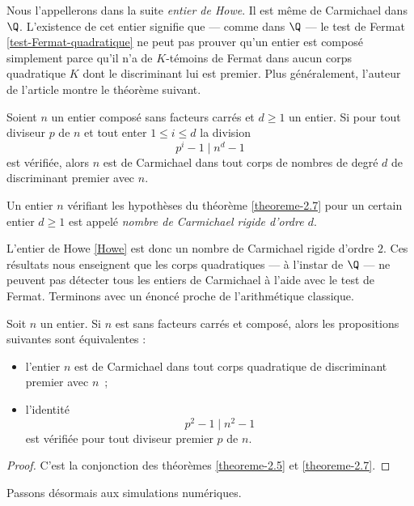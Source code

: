 Nous l'appellerons dans la suite \emph{entier de Howe}. Il est même de Carmichael dans $\Q$. L'existence de cet entier signifie que — comme dans $\Q$ — le test de Fermat \ref{test-Fermat-quadratique} ne peut pas prouver qu'un entier est composé simplement parce qu'il n'a de $K$-témoins de Fermat dans aucun corps quadratique $K$ dont le discriminant lui est premier. Plus généralement, l'auteur de l'article montre le théorème suivant.

\begin{theoreme}\label{theoreme-2.7}
	Soient $n$ un entier composé sans facteurs carrés et $d\geq 1$ un entier. Si pour tout diviseur $p$ de $n$ et tout enter $1\leq i \leq d$ la division $$p^i - 1\mid n^d - 1$$ est vérifiée, alors $n$ est de Carmichael dans tout corps de nombres de degré $d$ de discriminant premier avec $n$.
\end{theoreme}

\begin{definition}
	Un entier $n$ vérifiant les hypothèses du théorème \ref{theoreme-2.7} pour un certain entier $d\geq 1$ est appelé \emph{nombre de Carmichael rigide d'ordre $d$}.
\end{definition}

L'entier de Howe \ref{Howe} est donc un nombre de Carmichael rigide d'ordre $2$. Ces résultats nous enseignent que les corps quadratiques — à l'instar de $\Q$ — ne peuvent pas détecter tous les entiers de Carmichael à l'aide avec le test de Fermat. Terminons avec un énoncé proche de l'arithmétique classique.

\begin{corollaire}
	Soit $n$ un entier. Si $n$ est sans facteurs carrés et composé, alors les propositions suivantes sont équivalentes :
	\begin{itemize}
		\item l'entier $n$ est de Carmichael dans tout corps quadratique de discriminant premier avec $n$~;
		\item l'identité \[p^2 - 1 \mid n^2 - 1\] est vérifiée pour tout diviseur premier $p$ de $n$.
	\end{itemize}
\end{corollaire}

\begin{proof}
	C'est la conjonction des théorèmes \ref{theoreme-2.5} et \ref{theoreme-2.7}.
\end{proof}

Passons désormais aux simulations numériques.

